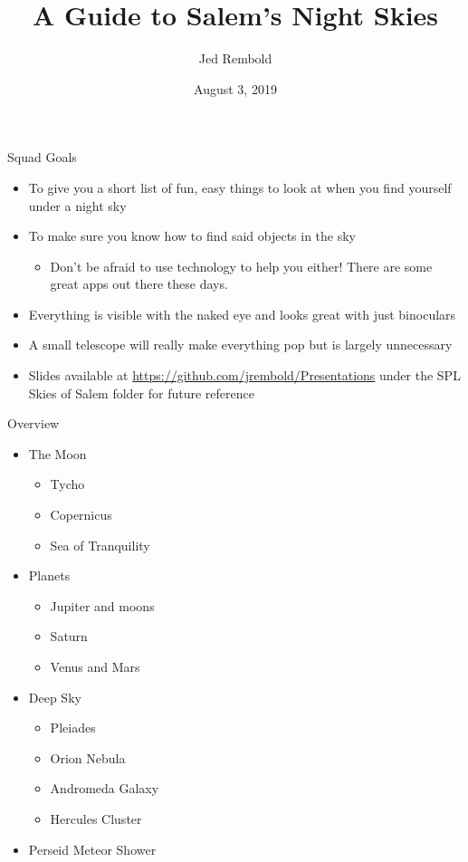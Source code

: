 \documentclass[pdf, ]{beamer}
\title{A Guide to Salem's Night Skies}
\author{Jed Rembold}
\institute{Willamette University}
\date{August 3, 2019}
\begin{document}
\renewcommand{\theenumi}{\Alph{enumi}}

{
	\maketitle
}

\begin{frame}{Squad Goals}
	\begin{itemize}
		\item To give you a short list of fun, easy things to look at when you find yourself under a night sky
		\item To make sure you know how to find said objects in the sky
			\begin{itemize}
				\item Don't be afraid to use technology to help you either! There are some great apps out there these days.
			\end{itemize}
			
		\item Everything is visible with the naked eye and looks great with just binoculars
		\item A small telescope will really make everything pop but is largely unnecessary
		\item Slides available at \url{https://github.com/jrembold/Presentations} under the SPL Skies of Salem folder for future reference

	\end{itemize}
	
\end{frame}

\begin{frame}{Overview}
	\begin{itemize}
		\item The Moon
			\begin{itemize}
				\item Tycho
				\item Copernicus
				\item Sea of Tranquility
			\end{itemize}
		\item Planets
			\begin{itemize}
				\item Jupiter and moons
				\item Saturn
				\item Venus and Mars
			\end{itemize}
		\item Deep Sky
			\begin{itemize}
				\item Pleiades
				\item Orion Nebula
				\item Andromeda Galaxy
				\item Hercules Cluster
			\end{itemize}
		\item Perseid Meteor Shower
	\end{itemize}
\end{frame}
\end{document}
